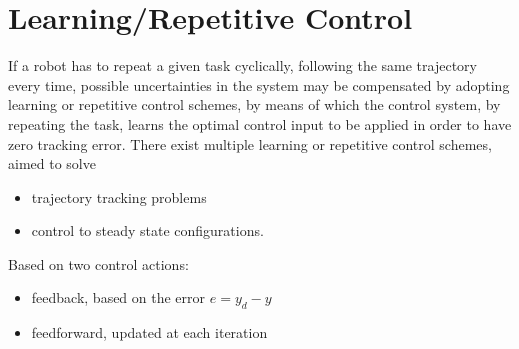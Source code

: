 \documentclass{book}
\begin{document}
\chapter{Learning/Repetitive Control}
If a robot has to repeat a given task cyclically, following the same trajectory every time, possible uncertainties in the system may be compensated by adopting learning or repetitive control schemes, by means of which the control system, by repeating the task, learns the optimal control input to be applied in order to have zero tracking error. There exist multiple learning or repetitive control schemes, aimed to solve 
\begin{itemize}
    \item trajectory tracking problems 
    \item control to steady state configurations.
\end{itemize}
Based on two control actions: 
\begin{itemize}
    \item feedback, based on the error $e=y_d-y$ 
    \item feedforward, updated at each iteration
\end{itemize}
\end{document}

